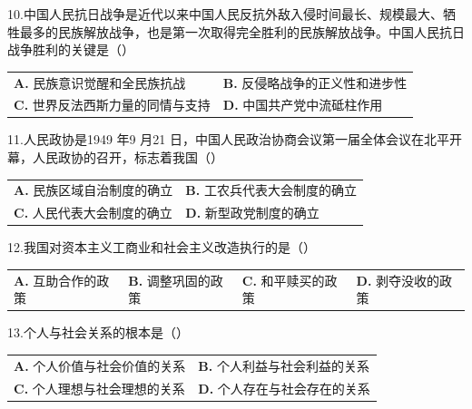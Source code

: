 \documentclass[UTF8,11pt]{ctexart}
\begin{document}
10.中国人民抗日战争是近代以来中国人民反抗外敌入侵时间最长、规模最大、牺牲最多的民族解放战争，也是第一次取得完全胜利的民族解放战争。中国人民抗日战争胜利的关键是（）


\begin{center}\begin{tabular}{>{\raggedright\arraybackslash}p{\dimexpr(\linewidth-4\tabcolsep)/2\relax}>{\raggedright\arraybackslash}p{\dimexpr(\linewidth-4\tabcolsep)/2\relax}}
\textbf{A.} 民族意识觉醒和全民族抗战 & \textbf{B.} 反侵略战争的正义性和进步性\\[.35em]
\textbf{C.} 世界反法西斯力量的同情与支持 & \textbf{D.} 中国共产党中流砥柱作用\\[.35em]\end{tabular}\end{center}

11.人民政协是1949 年9 月21 日，中国人民政治协商会议第一届全体会议在北平开幕，人民政协的召开，标志着我国（）


\begin{center}\begin{tabular}{>{\raggedright\arraybackslash}p{\dimexpr(\linewidth-4\tabcolsep)/2\relax}>{\raggedright\arraybackslash}p{\dimexpr(\linewidth-4\tabcolsep)/2\relax}}
\textbf{A.} 民族区域自治制度的确立 & \textbf{B.} 工农兵代表大会制度的确立\\[.35em]
\textbf{C.} 人民代表大会制度的确立 & \textbf{D.} 新型政党制度的确立\\[.35em]\end{tabular}\end{center}

12.我国对资本主义工商业和社会主义改造执行的是（）


\begin{center}\begin{tabular}{>{\raggedright\arraybackslash}p{\dimexpr(\linewidth-8\tabcolsep)/4\relax}>{\raggedright\arraybackslash}p{\dimexpr(\linewidth-8\tabcolsep)/4\relax}>{\raggedright\arraybackslash}p{\dimexpr(\linewidth-8\tabcolsep)/4\relax}>{\raggedright\arraybackslash}p{\dimexpr(\linewidth-8\tabcolsep)/4\relax}}
\textbf{A.} 互助合作的政策 & \textbf{B.} 调整巩固的政策 & \textbf{C.} 和平赎买的政策 & \textbf{D.} 剥夺没收的政策\\[.35em]\end{tabular}\end{center}

13.个人与社会关系的根本是（）


\begin{center}\begin{tabular}{>{\raggedright\arraybackslash}p{\dimexpr(\linewidth-4\tabcolsep)/2\relax}>{\raggedright\arraybackslash}p{\dimexpr(\linewidth-4\tabcolsep)/2\relax}}
\textbf{A.} 个人价值与社会价值的关系 & \textbf{B.} 个人利益与社会利益的关系\\[.35em]
\textbf{C.} 个人理想与社会理想的关系 & \textbf{D.} 个人存在与社会存在的关系\\[.35em]\end{tabular}\end{center}
\end{document}
